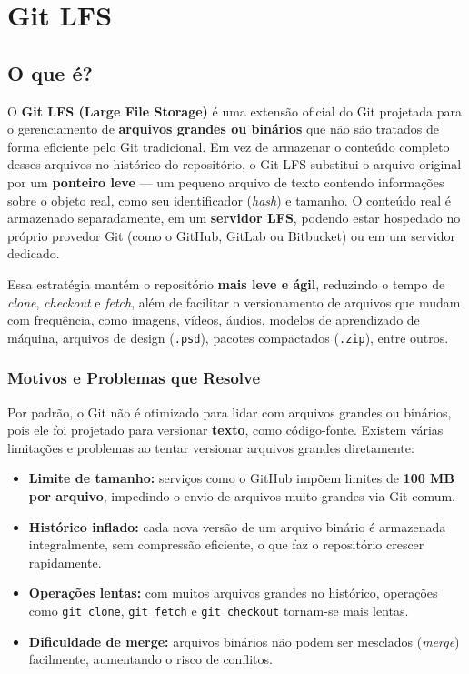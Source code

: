 \chapter{Git LFS}
\section{O que é?}

O \textbf{Git LFS (Large File Storage)} é uma extensão oficial do Git projetada para o gerenciamento de \textbf{arquivos grandes ou binários} que não são tratados de forma eficiente pelo Git tradicional.  
Em vez de armazenar o conteúdo completo desses arquivos no histórico do repositório, o Git LFS substitui o arquivo original por um \textbf{ponteiro leve} — um pequeno arquivo de texto contendo informações sobre o objeto real, como seu identificador (\textit{hash}) e tamanho.  
O conteúdo real é armazenado separadamente, em um \textbf{servidor LFS}, podendo estar hospedado no próprio provedor Git (como o GitHub, GitLab ou Bitbucket) ou em um servidor dedicado.

Essa estratégia mantém o repositório \textbf{mais leve e ágil}, reduzindo o tempo de \textit{clone}, \textit{checkout} e \textit{fetch}, além de facilitar o versionamento de arquivos que mudam com frequência, como imagens, vídeos, áudios, modelos de aprendizado de máquina, arquivos de design (\texttt{.psd}), pacotes compactados (\texttt{.zip}), entre outros.

\subsection{Motivos e Problemas que Resolve}

Por padrão, o Git não é otimizado para lidar com arquivos grandes ou binários, pois ele foi projetado para versionar \textbf{texto}, como código-fonte.  
Existem várias limitações e problemas ao tentar versionar arquivos grandes diretamente:

\begin{itemize}
  \item \textbf{Limite de tamanho:} serviços como o GitHub impõem limites de \textbf{100 MB por arquivo}, impedindo o envio de arquivos muito grandes via Git comum.
  \item \textbf{Histórico inflado:} cada nova versão de um arquivo binário é armazenada integralmente, sem compressão eficiente, o que faz o repositório crescer rapidamente.
  \item \textbf{Operações lentas:} com muitos arquivos grandes no histórico, operações como \texttt{git clone}, \texttt{git fetch} e \texttt{git checkout} tornam-se mais lentas.
  \item \textbf{Dificuldade de merge:} arquivos binários não podem ser mesclados (\textit{merge}) facilmente, aumentando o risco de conflitos.
\end{itemize}

